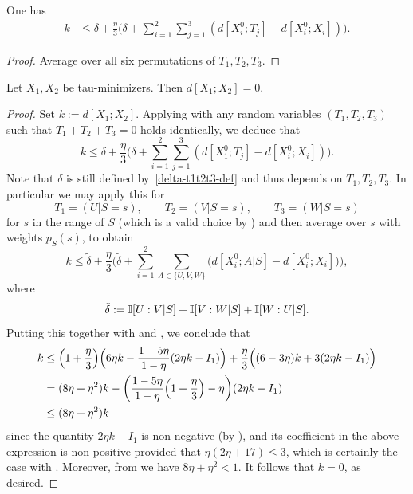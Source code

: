 \begin{lemma}\label{construct-good}
  \leanok
One has
\begin{align*}  k & \leq  \delta + \frac{\eta}{3} \biggl( \delta + \sum_{i=1}^2 \sum_{j = 1}^3 (d[X^0_i;T_j] - d[X^0_i; X_i]) \biggr).
  \end{align*}
\end{lemma}

\begin{proof}
\leanok
Average  over all six permutations of $T_1,T_2,T_3$.
\end{proof}




\begin{theorem}\label{de-prop}
  \leanok
  Let $X_1, X_2$ be tau-minimizers.  Then $d[X_1;X_2] = 0$.
\end{theorem}

\begin{proof}
  \leanok
  Set $k := d[X_1;X_2]$.  Applying  with any random variables $(T_1,T_2,T_3)$ such that $T_1+T_2+T_3=0$ holds identically, we deduce that
\[
  k \leq \delta + \frac{\eta}{3} \biggl( \delta + \sum_{i=1}^2 \sum_{j = 1}^3 (d[X^0_1;T_j] - d[X^0_i;X_i]) \biggr).
\]
Note that $\delta$ is still defined by~\eqref{delta-t1t2t3-def} and thus depends on $T_1,T_2,T_3$.
In particular we may apply this for
\[
  T_1 = (U | S = s),\qquad T_2 = (V | S = s), \qquad T_3 = (W | S = s)
\]
for $s$ in the range of $S$ (which is a valid choice by ) and then average over $s$ with weights $p_S(s)$, to obtain
\[k \leq \tilde \delta + \frac{\eta}{3} \biggl( \tilde \delta + \sum_{i=1}^2 \sum_{A\in\{U,V,W\}} \bigl(  d[X^0_i;A|S] - d[X^0_i;X_i]\bigr) \biggr),\]
where
\[
  \tilde \delta :=  \mathbb{I}[U : V | S] + \mathbb{I}[V : W | S] + \mathbb{I}[W : U | S].
\]
Putting this together with  and , we conclude that
\begin{align*}
  k &\leq \Bigl(1+\frac{\eta}{3}\Bigr)\Bigl(6\eta k-\frac{1-5\eta}{1-\eta}(2\eta k-I_1)\Bigr)+\frac{\eta}{3}\Bigl((6-3\eta)k+3(2\eta k-I_1)\Bigr)\\
  &= (8\eta + \eta^2) k - \biggl( \frac{1 - 5 \eta}{1-\eta}\Bigl(1 + \frac{\eta}{3}\Bigr) -  \eta \biggr)(2 \eta k - I_1)\\
  &\leq (8 \eta + \eta^2) k
 \end{align*}
since the quantity $2 \eta k - I_1$ is non-negative (by ), and its coefficient in the above expression is non-positive provided that $\eta(2\eta + 17) \le 3$, which is certainly the case with .
Moreover, from  we have $8 \eta + \eta^2 < 1$. It follows that $k=0$, as desired.
\end{proof}


